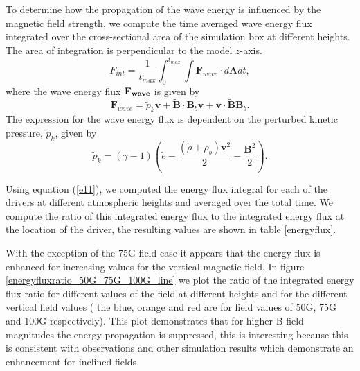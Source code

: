 \documentclass[twocolumn]{aastex62}
\begin{document}
To determine how the propagation of the wave energy is influenced by the magnetic field strength, we compute the time averaged wave energy flux integrated over the cross-sectional area of the simulation box at different heights. The area of integration is perpendicular to the model $z$-axis.
\begin{equation}
F_{int}= \frac{1}{t_{max}} \int_{0}^{t_{max}} \int {\mathbf F}_{wave} \cdot d{\mathbf A}dt,
\label{e11}
\end{equation}
where the wave energy flux $\bf{F}_{wave}$ is given by
$$
{\mathbf F}_{wave}=\tilde{p}_{k} {\mathbf v}+\tilde{\mathbf B}\cdot {\mathbf B_{b}}{\mathbf v}+{\mathbf v}\cdot \tilde{\mathbf B}{\mathbf B_{b}} .
$$
The expression for the wave energy flux is dependent on the perturbed kinetic pressure, $\tilde{p}_{k}$, given by \citet{Bogdan2003}
$$
\tilde{p}_{k}=\left(\gamma - 1\right)\left( \tilde{e}-\frac{ \left( \tilde{\rho} +\rho_b \right){\mathbf v}^2}{2}-\frac{{\mathbf B}^2}{2}\right).
$$


Using equation (\ref{e11}), we computed the energy flux integral for each of the drivers at different atmospheric heights and averaged over the total time. We compute the ratio of this integrated energy flux to the integrated energy flux at the location of the driver, the resulting values are shown in table \ref{energyflux}.



With the exception of the 75G field case it appears that the energy flux is enhanced for increasing values for the vertical magnetic field. In figure \ref{energyfluxratio_50G_75G_100G_line} we plot the ratio of the integrated energy flux ratio for different values of the field at different heights and for the different vertical field values ( the blue, orange and red  are for field values of 50G, 75G and 100G respectively). This plot demonstrates that for higher B-field magnitudes the energy propagation is suppressed, this is interesting because this is consistent with observations and other simulation results which demonstrate an enhancement for inclined fields.

\end{document}
